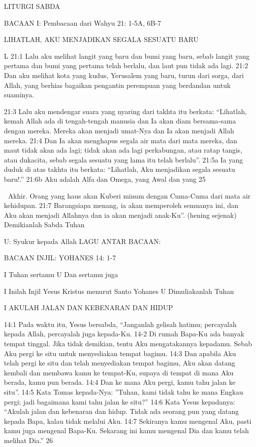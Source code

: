 \documentclass[10pt,a5paper,fancyhdr]{memoir}
\begin{document}
LITURGI SABDA 

BACAAN I: Pembacaan dari Wahyu 21: 1-5A, 6B-7 

LIHATLAH, AKU MENJADIKAN SEGALA SESUATU BARU 

L 21:1 Lalu aku melihat langit yang baru dan bumi yang baru, 
sebab langit yang pertama dan bumi yang pertama telah berlalu, dan 
laut pun tidak ada lagi. 21:2 Dan aku melihat kota yang kudus, 
Yerusalem yang baru, turun dari sorga, dari Allah, yang berhias 
bagaikan pengantin perempuan yang berdandan untuk suaminya. 

21:3 Lalu aku mendengar suara yang nyaring dari takhta itu berkata: 
“Lihatlah, kemah Allah ada di tengah-tengah manusia dan Ia akan 
diam bersama-sama dengan mereka. Mereka akan menjadi umat-Nya 
dan Ia akan menjadi Allah mereka. 21:4 Dan Ia akan menghapus 
segala air mata dari mata mereka, dan maut tidak akan ada lagi; tidak 
akan ada lagi perkabungan, atau ratap tangis, atau dukacita, sebab 
segala sesuatu yang lama itu telah berlalu”. 21:5a Ia yang duduk di 
atas takhta itu berkata: “Lihatlah, Aku menjadikan segala sesuatu 
baru!.” 21:6b Aku adalah Alfa dan Omega, yang Awal dan yang 
25 



Akhir. Orang yang haus akan Kuberi minum dengan Cuma-Cuma 
dari mata air kehidupan. 21:7 Barangsiapa menang, ia akan 
memperoleh semuanya ini, dan Aku akan menjadi Allahnya dan ia 
akan menjadi anak-Ku”. (hening sejenak) 
Demikianlah Sabda Tuhan 

U: Syukur kepada Allah 
LAGU ANTAR BACAAN: 

BACAAN INJIL: YOHANES 14: 1-7 

I Tuhan sertamu 
U Dan sertamu juga 

I Inilah Injil Yesus Kristus menurut Santo Yohanes 
U Dimuliakanlah Tuhan 

I AKULAH JALAN DAN KEBENARAN DAN HIDUP 

14:1 Pada waktu itu, Yesus bersabda, “Janganlah gelisah hatimu; 
percayalah kepada Allah, percayalah juga kepada-Ku. 14-2 Di rumah 
Bapa-Ku ada banyak tempat tinggal. Jika tidak demikian, tentu Aku 
mengatakannya kepadamu. Sebab Aku pergi ke situ untuk 
menyediakan tempat bagimu. 14:3 Dan apabila Aku telah pergi ke 
situ dan telah menyediakan tempat bagimu, Aku akan datang kembali 
dan membawa kamu ke tempat-Ku, supaya di tempat di mana Aku 
berada, kamu pun berada. 14:4 Dan ke mana Aku pergi, kamu tahu 
jalan ke situ”. 14:5 Kata Tomas kepada-Nya: ”Tuhan, kami tidak 
tahu ke mana Engkau pergi; jadi bagaimana kami tahu jalan ke situ?” 
14:6 Kata Yesus kepadanya: “Akulah jalan dan kebenaran dan hidup. 
Tidak ada seorang pun yang datang kepada Bapa, kalau tidak melalui 
Aku. 14:7 Sekiranya kamu mengenal Aku, pasti kamu juga mengenal 
Bapa-Ku. Sekarang ini kamu mengenal Dia dan kamu telah melihat 
Dia.” 
26 
\end{document}
